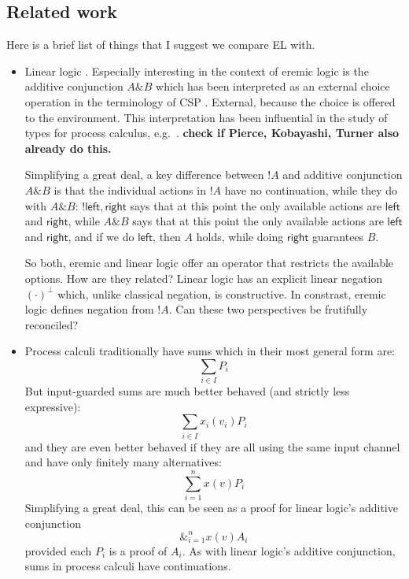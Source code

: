 \subsection{Related work}

Here is a brief list of things that I suggest we compare EL with.

\begin{itemize}

\item Linear logic \cite{GirardJY:linlog,GirardJY:protyp}. Especially
  interesting in the context of eremic logic is the additive
  conjunction $A \& B$ which has been interpreted
  \cite{AbramskyS:comintoll} as an external choice operation in the
  terminology of CSP \cite{HoareC:comseq}. External, because the
  choice is offered to the environment. This interpretation has been
  influential in the study of types for process calculus,
  e.g.~\cite{HondaK:unitypsfsifLONG,TakeuchiK:intbaslaits,HondaK:lanpriatdfscbp}. \textbf{check
    if Pierce, Kobayashi, Turner also already do this.}

  Simplifying a great deal, a key difference between $!A$ and additive
  conjunction $A \& B$ is that the individual actions in $!A$ have no
  continuation, while they do with $A \& B$: $!{\mathsf{left},
    \mathsf{right}}$ says that at this point the only available
  actions are $\mathsf{left}$ and $\mathsf{right}$, while $A \& B$
  says that at this point the only available actions are
  $\mathsf{left}$ and $\mathsf{right}$, and if we do $\mathsf{left}$,
  then $A$ holds, while doing $\mathsf{right}$ guarantees $B$.

  So both, eremic and linear logic offer an operator that restricts
  the available options. How are they related? Linear logic has an
  explicit linear negation $(\cdot)^{\bot}$ which, unlike classical
  negation, is constructive. In constrast, eremic logic defines
  negation from $!A$. Can these two perspectives be frutifully
  reconciled?

\item Process calculi traditionally 
  have sums which in their most general form are:
  \[
     \sum_{i \in I} P_i
  \]
  But input-guarded sums are much better behaved (and strictly less
  expressive):
  \[
     \sum_{i \in I} x_{i}(v_i)P_i
  \]
  and they are even better behaved if they are all using the same
  input channel and have only finitely many alternatives:
  \[
     \sum_{i = 1}^n x(v)P_i
  \]
  Simplifying a great deal, this can be seen as a proof for linear
  logic's additive conjunction
  \[
     \&_{i = 1}^n x(v)A_i
  \]
  provided each $P_i$ is a proof of $A_i$.  As with linear logic's
  additive conjunction, sums in process calculi have continuations.

\end{itemize}
